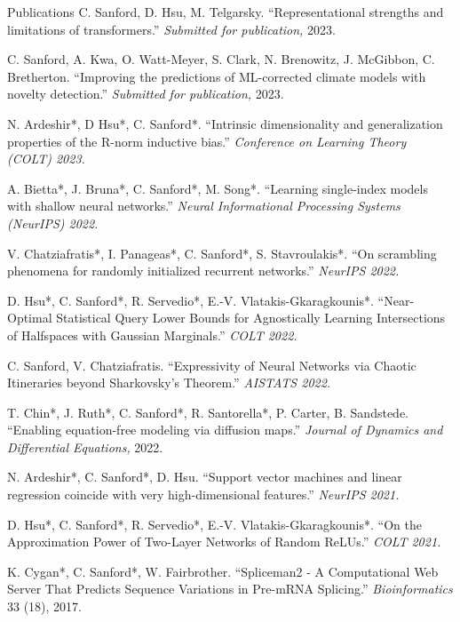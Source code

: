 \documentclass{resume} %
\begin{document}
\begin{rSection}{Publications}
C. Sanford, D. Hsu, M. Telgarsky. ``Representational strengths and limitations of transformers.'' \textit{Submitted for publication,} 2023.


C. Sanford, A. Kwa, O. Watt-Meyer, S. Clark, N. Brenowitz, J. McGibbon, C. Bretherton. ``Improving the predictions of ML-corrected climate models with novelty detection.'' \textit{Submitted for publication,} 2023.

N. Ardeshir*, D Hsu*, C. Sanford*. ``Intrinsic dimensionality and generalization properties of the R-norm inductive bias.'' \textit{Conference on Learning Theory (COLT) 2023.}

A. Bietta*, J. Bruna*, C. Sanford*, M. Song*. ``Learning single-index models with shallow neural networks.'' \textit{Neural Informational Processing Systems (NeurIPS) 2022.}

V. Chatziafratis*, I. Panageas*, C. Sanford*, S. Stavroulakis*. ``On scrambling phenomena for randomly initialized recurrent networks.'' \textit{NeurIPS 2022.}

D. Hsu*, C. Sanford*, R. Servedio*, E.-V. Vlatakis-Gkaragkounis*. ``Near-Optimal Statistical Query Lower Bounds for Agnostically Learning Intersections of Halfspaces with Gaussian Marginals.'' \textit{COLT 2022.}


C. Sanford, V. Chatziafratis. ``Expressivity of Neural Networks via Chaotic Itineraries beyond Sharkovsky's Theorem.'' \textit{AISTATS 2022.}


T. Chin*, J. Ruth*, C. Sanford*, R. Santorella*, P. Carter, B. Sandstede. ``Enabling equation-free modeling via diffusion maps.'' \textit{Journal of Dynamics and Differential Equations,} 2022.


N. Ardeshir*, C. Sanford*, D. Hsu. ``Support vector machines and linear regression coincide with very high-dimensional features.'' \textit{NeurIPS 2021.}


D. Hsu*, C. Sanford*, R. Servedio*, E.-V. Vlatakis-Gkaragkounis*. ``On the Approximation Power of Two-Layer Networks of Random ReLUs.'' \textit{COLT 2021.}


K. Cygan*, C. Sanford*, W. Fairbrother. ``Spliceman2 - A Computational Web Server That Predicts Sequence Variations in Pre-mRNA Splicing.''
\textit{Bioinformatics} 33 (18), 2017.


\end{rSection}


\end{document}
